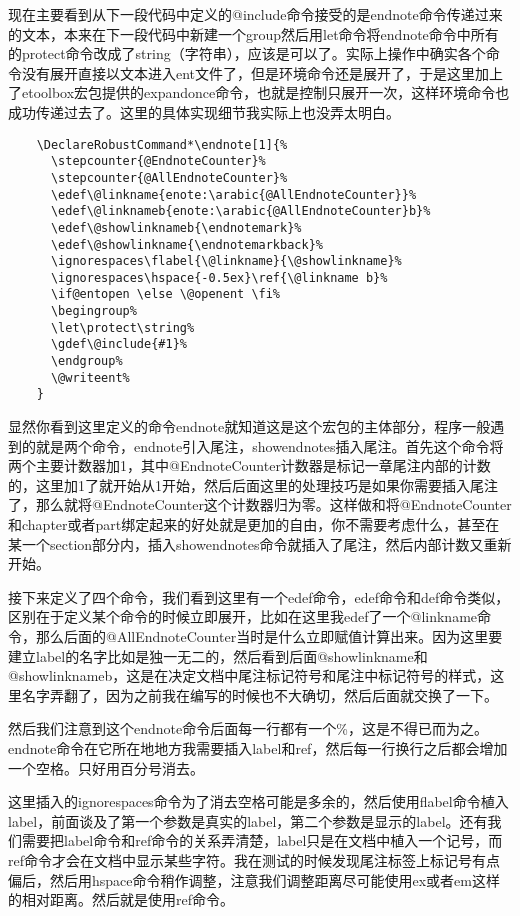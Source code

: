 \documentclass[11pt,oneside]{book}
\begin{document}
  现在主要看到从下一段代码中定义的@include命令接受的是endnote命令传递过来的文本，本来在下一段代码中新建一个group然后用let命令将endnote命令中所有的protect命令改成了string（字符串），应该是可以了。实际上操作中确实各个命令没有展开直接以文本进入ent文件了，但是环境命令还是展开了，于是这里加上了etoolbox宏包提供的expandonce命令，也就是控制只展开一次，这样环境命令也成功传递过去了。这里的具体实现细节我实际上也没弄太明白。

  \begin{Verbatim}
    \DeclareRobustCommand*\endnote[1]{%
      \stepcounter{@EndnoteCounter}%
      \stepcounter{@AllEndnoteCounter}%
      \edef\@linkname{enote:\arabic{@AllEndnoteCounter}}%
      \edef\@linknameb{enote:\arabic{@AllEndnoteCounter}b}%
      \edef\@showlinknameb{\endnotemark}%
      \edef\@showlinkname{\endnotemarkback}%
      \ignorespaces\flabel{\@linkname}{\@showlinkname}%
      \ignorespaces\hspace{-0.5ex}\ref{\@linkname b}%
      \if@entopen \else \@openent \fi%
      \begingroup%
      \let\protect\string%
      \gdef\@include{#1}%
      \endgroup%
      \@writeent%
    }
  \end{Verbatim}
  显然你看到这里定义的命令endnote就知道这是这个宏包的主体部分，程序一般遇到的就是两个命令，endnote引入尾注，showendnotes插入尾注。首先这个命令将两个主要计数器加1，其中@EndnoteCounter计数器是标记一章尾注内部的计数的，这里加1了就开始从1开始，然后后面这里的处理技巧是如果你需要插入尾注了，那么就将@EndnoteCounter这个计数器归为零。这样做和将@EndnoteCounter和chapter或者part绑定起来的好处就是更加的自由，你不需要考虑什么，甚至在某一个section部分内，插入showendnotes命令就插入了尾注，然后内部计数又重新开始。

  接下来定义了四个命令，我们看到这里有一个edef命令，edef命令和def命令类似，区别在于定义某个命令的时候立即展开，比如在这里我edef了一个@linkname命令，那么后面的@AllEndnoteCounter当时是什么立即赋值计算出来。因为这里要建立label的名字比如是独一无二的，然后看到后面@showlinkname和@showlinknameb，这是在决定文档中尾注标记符号和尾注中标记符号的样式，这里名字弄翻了，因为之前我在编写的时候也不大确切，然后后面就交换了一下。

  然后我们注意到这个endnote命令后面每一行都有一个\%，这是不得已而为之。endnote命令在它所在地地方我需要插入label和ref，然后每一行换行之后都会增加一个空格。只好用百分号消去。

  这里插入的ignorespaces命令为了消去空格可能是多余的，然后使用flabel命令植入label，前面谈及了第一个参数是真实的label，第二个参数是显示的label。还有我们需要把label命令和ref命令的关系弄清楚，label只是在文档中植入一个记号，而ref命令才会在文档中显示某些字符。我在测试的时候发现尾注标签上标记号有点偏后，然后用hspace命令稍作调整，注意我们调整距离尽可能使用ex或者em这样的相对距离。然后就是使用ref命令。
\end{document}
